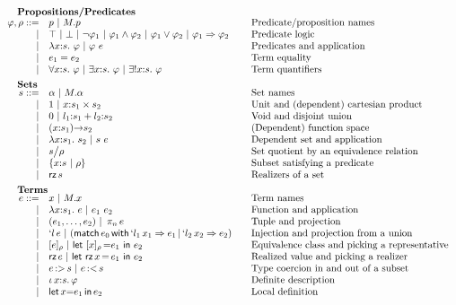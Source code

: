 \begin{figure}
	\[
	\begin{array}{rl@{\qquad}l}
		\noalign{\textbf{Propositions/Predicates}}
		\ip,\ipp ::= 
		    & \iP \ibar \iselect{\im}{\iP}&\mbox{Predicate/proposition names}\\
		  | & \itrue \ | \ \ifalse \ibar \inot{\ip_1} \ibar \iand{\ip_1}{\ip_2} \ibar 
		       \ior{\ip_1}{\ip_2}\ | \ \iimply{\ip_1}{\ip_2} & \mbox{Predicate logic}\\
		  | & \ilambda{\ix}{\is}{\ip}  \ibar \iapp{\ip}{\ie} & \mbox{Predicates and application}\\
		  | & \iequal{\ie_1}{\ie_2} & \mbox{Term equality}\\
		  | & \iforall{\ix}{\is}{\ip}  \ibar 
		      \iexists{\ix}{\is}{\ip} \ |\
		      \iunique{\ix}{\is}{\ip} & \mbox{Term quantifiers}\\[5pt]
		
		\noalign{\textbf{Sets}}
		\is ::= 
		    & \iS  \ibar \iselect{\im}{\iS} &\mbox{Set names}\\
		  | & \isunit \ibar \iprod{\ix}{\is_1}{\is_2}
                  &\mbox{Unit and (dependent) cartesian product}\\
		  | & \isvoid \ibar \isum{\il_1}{\is_1}{\il_2}{\is_2} &\mbox{Void and disjoint union}\\
		  | & \idarrow{\ix}{\is_1}{\is_2} & \mbox{(Dependent) function space} \\
		  | & \ilambda{\ix}{\is_1}{\is_2} \ibar 
		      \iapp{\is}{\ie} &\mbox{Dependent set and application}\\
		  | & \iquot{\is}{\ipp} & \mbox{Set quotient by an equivalence relation}\\
		  | & \isubset{\ix}{\is}{\ipp} & \mbox{Subset satisfying a predicate}\\
		  | & \irz{\is}&\mbox{Realizers of a set}\\[5pt] 
		
		\noalign{\textbf{Terms}}	
		\ie ::=
		    & \ix \ibar \iselect{\im}{\ix} &\mbox{Term names}\\
		  | & \ilambda{\ix}{\is_1}{\ie} \ibar 
		      \iapp{\ie_1}{\ie_2} &\mbox{Function and application}\\
		  | & \ituple{\ie_1}{\ie_2} 
		      \ibar \iproj{\ie}{n}&\mbox{Tuple and projection}\\
		  | & \iinj{\il}{\ie} 
		      \ibar (\imatch{\ie_0}{\il_1}{\ix_1}{\ie_1}{\il_2}{\ix_2}{\ie_2})&\mbox{Injection and projection from a union}\\
		  | & \ieclass{\ie}{\ipp}
		      \ibar \ileteclass{\ix}{\ipp}{\ie_1}{\ie_2}&\mbox{Equivalence class and picking a representative}\\
		  | & \irz{\ie}
		      \ibar \iletrz{\ix}{\ie_1}{\ie_2}&\mbox{Realized value and picking a realizer}\\
		  | & \isubin{\ie}{\is} \ibar \isubout{\ie}{\is} &\mbox{Type coercion in and out of a subset}\\
		  | & \ithe{\ix}{\is}{\ip}&\mbox{Definite description}\\
		  | & \ilet{\ix}{\ie_1}{\ie_2}&\mbox{Local definition}\\[5pt]
		

\end{array}\]
\end{figure}
